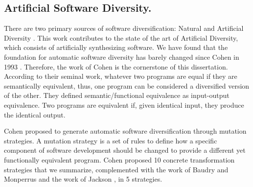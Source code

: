 \subsection*{Artificial Software Diversity.}

There are two primary sources of software diversification: Natural and Artificial Diversity \cite{natural_diversity}. This work contributes to the state of the art of Artificial Diversity, which consists of artificially synthesizing software. 
We have found that the foundation for automatic software diversity has barely changed since Cohen in 1993 \cite{cohen1993operating}. Therefore, the work of Cohen is the cornerstone of this dissertation.
According to their seminal work, whatever two programs are equal if they are semantically equivalent, thus, one program can be considered a diversified version of the other. 
They defined semantic/functional equivalence as input-output equivalence. Two programs are equivalent if, given identical input, they produce the identical output. 

Cohen \etal proposed to generate automatic software diversification through mutation strategies.
A mutation strategy is a set of rules to define how a specific component of software development should be changed to provide a different yet functionally equivalent program. Cohen \etal proposed 10 concrete transformation strategies that we summarize, complemented with the work of Baudry and Monperrus \cite{natural_diversity} and the work of Jackson \etal \cite{jackson}, in 5 strategies.






